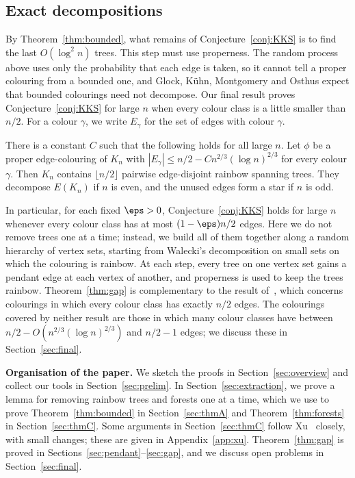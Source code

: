\subsection{Exact decompositions}\label{sec:exact}
By Theorem~\ref{thm:bounded}, what remains of Conjecture~\ref{conj:KKS} is to find the last $O(\log^2 n)$ trees.
This step must use properness.
The random process above uses only the probability that each edge is taken, so it cannot tell a proper colouring from a bounded one, and Glock, K\"uhn, Montgomery and Osthus expect that bounded colourings need not decompose.
Our final result proves Conjecture~\ref{conj:KKS} for large $n$ when every colour class is a little smaller than $n/2$.
For a colour $\gamma$, we write $E_\gamma$ for the set of edges with colour $\gamma$.

\begin{theorem}\label{thm:gap}
There is a constant $C$ such that the following holds for all large $n$.
Let $\phi$ be a proper edge-colouring of $K_n$ with $|E_\gamma|\le n/2-Cn^{2/3}(\log n)^{2/3}$ for every colour $\gamma$.
Then $K_n$ contains $\lfloor n/2\rfloor$ pairwise edge-disjoint rainbow spanning trees.
They decompose $E(K_n)$ if $n$ is even, and the unused edges form a star if $n$ is odd.
\end{theorem}

In particular, for each fixed $\eps>0$, Conjecture~\ref{conj:KKS} holds for large $n$ whenever every colour class has at most $(1-\eps)n/2$ edges.
Here we do not remove trees one at a time; instead, we build all of them together along a random hierarchy of vertex sets, starting from Walecki's decomposition on small sets on which the colouring is rainbow.
At each step, every tree on one vertex set gains a pendant edge at each vertex of another, and properness is used to keep the trees rainbow.
Theorem~\ref{thm:gap} is complementary to the result of~\cite{GKMO}, which concerns colourings in which every colour class has exactly $n/2$ edges.
The colourings covered by neither result are those in which many colour classes have between $n/2-O(n^{2/3}(\log n)^{2/3})$ and $n/2-1$ edges; we discuss these in Section~\ref{sec:final}.

\smallskip

\noindent\textbf{Organisation of the paper.}
We sketch the proofs in Section~\ref{sec:overview} and collect our tools in Section~\ref{sec:prelim}.
In Section~\ref{sec:extraction}, we prove a lemma for removing rainbow trees and forests one at a time, which we use to prove Theorem~\ref{thm:bounded} in Section~\ref{sec:thmA} and Theorem~\ref{thm:forests} in Section~\ref{sec:thmC}.
Some arguments in Section~\ref{sec:thmC} follow Xu~\cite{Xu} closely, with small changes; these are given in Appendix~\ref{app:xu}.
Theorem~\ref{thm:gap} is proved in Sections~\ref{sec:pendant}--\ref{sec:gap}, and we discuss open problems in Section~\ref{sec:final}.

